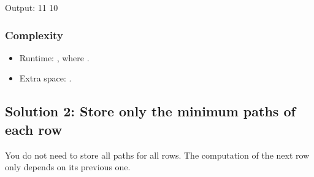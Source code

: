 \documentclass[letterpaper,12pt,english]{book}
\begin{document}
\begin{sphinxVerbatim}[commandchars=\\\{\}]
\end{sphinxVerbatim}

\begin{sphinxVerbatim}[commandchars=\\\{\}]
Output:
11
\PYGZhy{}10
\end{sphinxVerbatim}


\subsubsection{Complexity}
\label{\detokenize{Dynamic_Programming/05_DP_120_Triangle:complexity}}\begin{itemize}
\item {} 
\sphinxAtStartPar
Runtime: , where .

\item {} 
\sphinxAtStartPar
Extra space: .

\end{itemize}


\subsection{Solution 2: Store only the minimum paths of each row}
\label{\detokenize{Dynamic_Programming/05_DP_120_Triangle:solution-2-store-only-the-minimum-paths-of-each-row}}
\sphinxAtStartPar
You do not need to store all paths for all rows. The computation of the next row only depends on its previous one.
\end{document}
